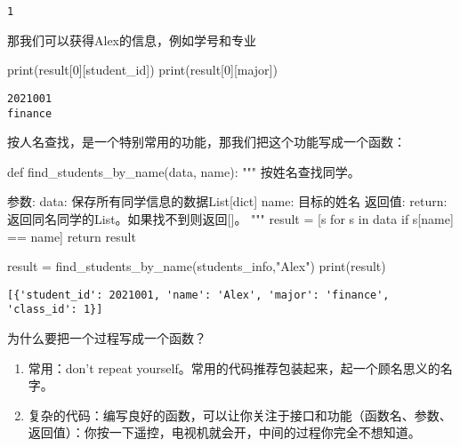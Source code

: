 \documentclass[
  letterpaper,
  DIV=11,
  numbers=noendperiod]{scrreprt}
\newenvironment{Shaded}{\begin{snugshade}}{\end{snugshade}}
\newcommand{\BuiltInTok}[1]{\textcolor[rgb]{0.00,0.23,0.31}{#1}}
\newcommand{\CommentTok}[1]{\textcolor[rgb]{0.37,0.37,0.37}{#1}}
\newcommand{\ControlFlowTok}[1]{\textcolor[rgb]{0.00,0.23,0.31}{#1}}
\newcommand{\DecValTok}[1]{\textcolor[rgb]{0.68,0.00,0.00}{#1}}
\newcommand{\KeywordTok}[1]{\textcolor[rgb]{0.00,0.23,0.31}{#1}}
\newcommand{\NormalTok}[1]{\textcolor[rgb]{0.00,0.23,0.31}{#1}}
\newcommand{\OperatorTok}[1]{\textcolor[rgb]{0.37,0.37,0.37}{#1}}
\newcommand{\StringTok}[1]{\textcolor[rgb]{0.13,0.47,0.30}{#1}}
\providecommand{\tightlist}{%
  \setlength{\itemsep}{0pt}\setlength{\parskip}{0pt}}\usepackage{longtable,booktabs,array}
\begin{document}
\begin{verbatim}
1
\end{verbatim}

那我们可以获得Alex的信息，例如学号和专业

\begin{Shaded}
\begin{Highlighting}[]
\BuiltInTok{print}\NormalTok{(result[}\DecValTok{0}\NormalTok{][}\StringTok{\textquotesingle{}student\_id\textquotesingle{}}\NormalTok{])}
\BuiltInTok{print}\NormalTok{(result[}\DecValTok{0}\NormalTok{][}\StringTok{\textquotesingle{}major\textquotesingle{}}\NormalTok{])}
\end{Highlighting}
\end{Shaded}

\begin{verbatim}
2021001
finance
\end{verbatim}

按人名查找，是一个特别常用的功能，那我们把这个功能写成一个函数：

\begin{Shaded}
\begin{Highlighting}[]
\KeywordTok{def}\NormalTok{ find\_students\_by\_name(data, name):}
    \CommentTok{"""}
\CommentTok{    按姓名查找同学。}

\CommentTok{    参数:}
\CommentTok{        data: 保存所有同学信息的数据List[dict]}
\CommentTok{        name: 目标的姓名}
\CommentTok{    返回值:}
\CommentTok{        return: 返回同名同学的List。如果找不到则返回[]。}
\CommentTok{    """}
\NormalTok{    result }\OperatorTok{=}\NormalTok{ [s }\ControlFlowTok{for}\NormalTok{ s }\KeywordTok{in}\NormalTok{ data }\ControlFlowTok{if}\NormalTok{ s[}\StringTok{\textquotesingle{}name\textquotesingle{}}\NormalTok{] }\OperatorTok{==}\NormalTok{ name]}
    \ControlFlowTok{return}\NormalTok{ result}

\NormalTok{result }\OperatorTok{=}\NormalTok{ find\_students\_by\_name(students\_info,}\StringTok{"Alex"}\NormalTok{)}
\BuiltInTok{print}\NormalTok{(result)}
\end{Highlighting}
\end{Shaded}

\begin{verbatim}
[{'student_id': 2021001, 'name': 'Alex', 'major': 'finance', 'class_id': 1}]
\end{verbatim}

为什么要把一个过程写成一个函数？

\begin{enumerate}
\def\labelenumi{\arabic{enumi}.}
\tightlist
\item
  常用：don't repeat
  yourself。常用的代码推荐包装起来，起一个顾名思义的名字。
\item
  复杂的代码：编写良好的函数，可以让你关注于接口和功能（函数名、参数、返回值）：你按一下遥控，电视机就会开，中间的过程你完全不想知道。
\end{enumerate}
\end{document}
